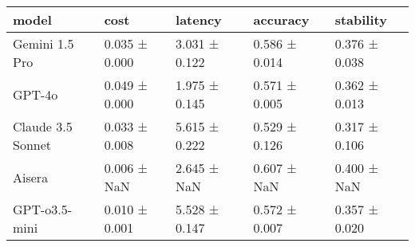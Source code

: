 \begin{tabular}{lllll}
\toprule
model & cost & latency & accuracy & stability \\
\midrule
Gemini 1.5 Pro & 0.035 ± 0.000 & 3.031 ± 0.122 & 0.586 ± 0.014 & 0.376 ± 0.038 \\
GPT-4o & 0.049 ± 0.000 & 1.975 ± 0.145 & 0.571 ± 0.005 & 0.362 ± 0.013 \\
Claude 3.5 Sonnet & 0.033 ± 0.008 & 5.615 ± 0.222 & 0.529 ± 0.126 & 0.317 ± 0.106 \\
Aisera & 0.006 ± NaN & 2.645 ± NaN & 0.607 ± NaN & 0.400 ± NaN \\
GPT-o3.5-mini & 0.010 ± 0.001 & 5.528 ± 0.147 & 0.572 ± 0.007 & 0.357 ± 0.020 \\
\bottomrule
\end{tabular}
